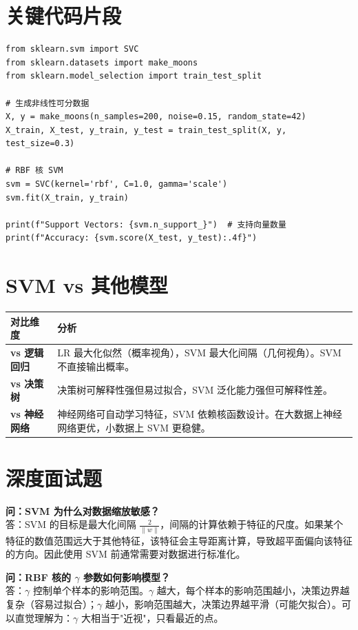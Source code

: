 \documentclass[12pt, a4paper]{article}
\begin{document}
\section{关键代码片段}
\begin{lstlisting}
from sklearn.svm import SVC
from sklearn.datasets import make_moons
from sklearn.model_selection import train_test_split

# 生成非线性可分数据
X, y = make_moons(n_samples=200, noise=0.15, random_state=42)
X_train, X_test, y_train, y_test = train_test_split(X, y, test_size=0.3)

# RBF 核 SVM
svm = SVC(kernel='rbf', C=1.0, gamma='scale')
svm.fit(X_train, y_train)

print(f"Support Vectors: {svm.n_support_}")  # 支持向量数量
print(f"Accuracy: {svm.score(X_test, y_test):.4f}")
\end{lstlisting}

\section{SVM vs 其他模型}
\begin{table}[h]
\centering
\begin{tabularx}{\textwidth}{|l|X|}
\hline
\textbf{对比维度} & \textbf{分析} \\
\hline
\textbf{vs 逻辑回归} & LR 最大化似然（概率视角），SVM 最大化间隔（几何视角）。SVM 不直接输出概率。 \\
\hline
\textbf{vs 决策树} & 决策树可解释性强但易过拟合，SVM 泛化能力强但可解释性差。 \\
\hline
\textbf{vs 神经网络} & 神经网络可自动学习特征，SVM 依赖核函数设计。在大数据上神经网络更优，小数据上 SVM 更稳健。 \\
\hline
\end{tabularx}
\end{table}

\section{深度面试题}

\textbf{问：SVM 为什么对数据缩放敏感？}\\
答：SVM 的目标是最大化间隔 $\frac{2}{\|w\|}$，间隔的计算依赖于特征的尺度。如果某个特征的数值范围远大于其他特征，该特征会主导距离计算，导致超平面偏向该特征的方向。因此使用 SVM 前通常需要对数据进行标准化。

\textbf{问：RBF 核的 $\gamma$ 参数如何影响模型？}\\
答：$\gamma$ 控制单个样本的影响范围。$\gamma$ 越大，每个样本的影响范围越小，决策边界越复杂（容易过拟合）；$\gamma$ 越小，影响范围越大，决策边界越平滑（可能欠拟合）。可以直觉理解为：$\gamma$ 大相当于"近视"，只看最近的点。
\end{document}
